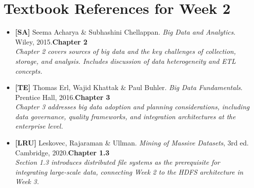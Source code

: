 \documentclass[12pt,a4paper]{article}
\begin{document}
\section*{Textbook References for Week 2}

\begin{itemize}[leftmargin=2em, itemsep=6pt]
  \item \textbf{[SA]} Seema Acharya \& Subhashini Chellappan. \textit{Big Data and Analytics}. Wiley, 2015.\hfill\textbf{Chapter 2}\\
        \small\textit{Chapter 2 covers sources of big data and the key challenges of collection, storage, and analysis.  Includes discussion of data heterogeneity and ETL concepts.}

  \item \textbf{[TE]} Thomas Erl, Wajid Khattak \& Paul Buhler. \textit{Big Data Fundamentals}. Prentice Hall, 2016.\hfill\textbf{Chapter 3}\\
        \small\textit{Chapter 3 addresses big data adoption and planning considerations, including data governance, quality frameworks, and integration architectures at the enterprise level.}

  \item \textbf{[LRU]} Leskovec, Rajaraman \& Ullman. \textit{Mining of Massive Datasets}, 3rd ed. Cambridge, 2020.\hfill\textbf{Chapter 1.3}\\
        \small\textit{Section 1.3 introduces distributed file systems as the prerequisite for integrating large-scale data, connecting Week 2 to the HDFS architecture in Week 3.}
\end{itemize}

\vspace{6pt}
\end{document}
